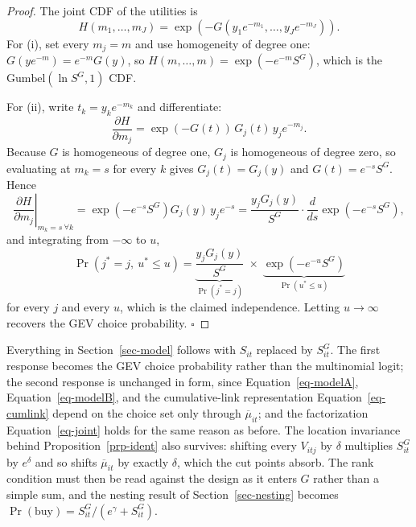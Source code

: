 \documentclass[
  letterpaper,
  DIV=11,
  numbers=noendperiod]{scrartcl}
\theoremstyle{plain}
\theoremstyle{plain}
\theoremstyle{remark}
\begin{document}
\begin{proof}
The joint CDF of the utilities is \[
H \left( m_1, \ldots, m_J \right)
= \exp \left( - G \left( y_1 e^{-m_1}, \ldots, y_J e^{-m_J} \right) \right).
\] For (i), set every \(m_j = m\) and use homogeneity of degree one:
\(G(y e^{-m}) = e^{-m} G(y)\), so
\(H(m, \ldots, m) = \exp \left( - e^{-m} S^{G} \right)\), which is the
\(\text{Gumbel}\left(\ln S^{G}, 1\right)\) CDF.

For (ii), write \(t_k = y_k e^{-m_k}\) and differentiate: \[
\frac{\partial H}{\partial m_j}
= \exp \left( -G(t) \right) \, G_j(t) \, y_j e^{-m_j}.
\] Because \(G\) is homogeneous of degree one, \(G_j\) is homogeneous of
degree zero, so evaluating at \(m_k = s\) for every \(k\) gives
\(G_j(t) = G_j(y)\) and \(G(t) = e^{-s} S^{G}\). Hence \[
\left. \frac{\partial H}{\partial m_j} \right|_{m_k = s \ \forall k}
= \exp \left( - e^{-s} S^{G} \right) G_j(y) \, y_j e^{-s}
= \frac{y_j G_j(y)}{S^{G}} \cdot \frac{d}{ds} \exp \left( - e^{-s} S^{G} \right),
\] and integrating from \(-\infty\) to \(u\), \[
\Pr \left( j^* = j, \ u^* \le u \right)
= \underbrace{\frac{y_j G_j(y)}{S^{G}}}_{\Pr \left( j^* = j \right)}
\; \times \;
\underbrace{\exp \left( - e^{-u} S^{G} \right)}_{\Pr \left( u^* \le u \right)}
\] for every \(j\) and every \(u\), which is the claimed independence.
Letting \(u \to \infty\) recovers the GEV choice probability.
\(\square\)
\end{proof}

Everything in Section~\ref{sec-model} follows with \(S_{it}\) replaced
by \(S^{G}_{it}\). The first response becomes the GEV choice probability
rather than the multinomial logit; the second response is unchanged in
form, since Equation~\ref{eq-modelA}, Equation~\ref{eq-modelB}, and the
cumulative-link representation Equation~\ref{eq-cumlink} depend on the
choice set only through \(\overline{\mu}_{it}\); and the factorization
Equation~\ref{eq-joint} holds for the same reason as before. The
location invariance behind Proposition~\ref{prp-ident} also survives:
shifting every \(V_{itj}\) by \(\delta\) multiplies \(S^{G}_{it}\) by
\(e^{\delta}\) and so shifts \(\overline{\mu}_{it}\) by exactly
\(\delta\), which the cut points absorb. The rank condition must then be
read against the design as it enters \(G\) rather than a simple sum, and
the nesting result of Section~\ref{sec-nesting} becomes
\(\Pr(\text{buy}) = S^{G}_{it} / \left( e^{\gamma} + S^{G}_{it} \right)\).
\end{document}
